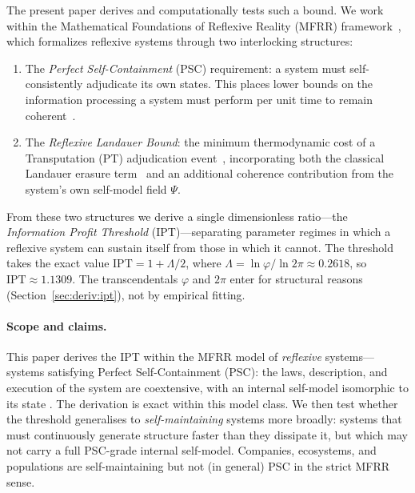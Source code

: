 \documentclass[11pt,twocolumn]{article}
\theoremstyle{remark}
\begin{document}
The present paper derives and computationally tests such a bound. We work
within the Mathematical Foundations of Reflexive Reality (MFRR)
framework~\cite{SpivackNEMSMFRRBridge,SpivackPhysicsPortal}, which
formalizes reflexive systems through two interlocking structures:

\begin{enumerate}[label=(\roman*)]
\item The \emph{Perfect Self-Containment} (PSC) requirement: a system
  must self-consistently adjudicate its own states. This places lower bounds
  on the information processing a system must perform per unit time to remain
  coherent~\cite{SpivackPSCOpt}.

\item The \emph{Reflexive Landauer Bound}: the minimum thermodynamic cost of
  a Transputation (PT) adjudication event~\cite{SpivackNEMSMFRRBridge}, incorporating both the classical
  Landauer erasure term~\cite{Landauer1961} and an additional coherence
  contribution from the system's own self-model field $\Psi$.
\end{enumerate}

From these two structures we derive a single dimensionless ratio---the
\emph{Information Profit Threshold} (IPT)---separating parameter regimes in
which a reflexive system can sustain itself from those in which it cannot. The
threshold takes the exact value $\mathrm{IPT} = 1 + \Lambda/2$, where
$\Lambda = \ln\varphi / \ln 2\pi \approx 0.2618$, so $\mathrm{IPT} \approx
1.1309$. The transcendentals $\varphi$ and $2\pi$ enter for structural
reasons (Section~\ref{sec:deriv:ipt}), not by empirical fitting.

\paragraph{Scope and claims.}
This paper derives the IPT within the MFRR model of \emph{reflexive} systems---systems
satisfying Perfect Self-Containment (PSC): the laws, description, and execution of the
system are coextensive, with an internal self-model isomorphic to its state
\cite{SpivackNEMSMFRRBridge}. The derivation is exact within this model class.
We then test whether the threshold generalises to \emph{self-maintaining} systems more broadly:
systems that must continuously generate structure faster than they dissipate it, but which may
not carry a full PSC-grade internal self-model. Companies, ecosystems, and populations are
self-maintaining but not (in general) PSC in the strict MFRR sense.
\end{document}
